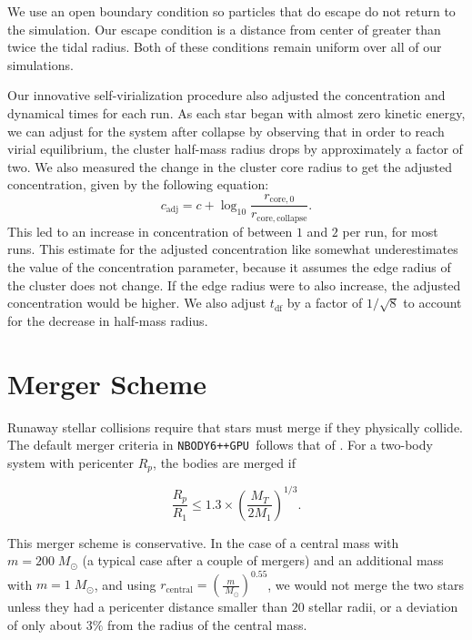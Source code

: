 \documentclass{princeton_astro_thesis}
\newcommand\Msun{\; M_\odot}
\newcommand\nbody{\texttt{NBODY6++GPU }}
\numberwithin{equation}{section}
\begin{document}
We use an open boundary condition so particles that do escape do not return to the simulation. Our escape condition is a distance from center of greater than twice the tidal radius. Both of these conditions remain uniform over all of our simulations. 

Our innovative self-virialization procedure also adjusted the concentration and dynamical times for each run.  As each star began with almost zero kinetic energy, we can adjust for the system after collapse by observing that in order to reach virial equilibrium, the cluster half-mass radius drops by approximately a factor of two. We also measured the change in the cluster core radius to get the adjusted concentration, given by the following equation:
\begin{equation}
c_{\mathrm{adj}} = c + \log_{10} \frac{r_{\mathrm{core},0}}{r_{\mathrm{core, collapse}}}.
\label{eqn:cadj}
\end{equation}
This led to an increase in concentration of between $1$ and $2$ per run, for most runs. This estimate for the adjusted concentration like somewhat underestimates the value of the concentration parameter, because it assumes the edge radius of the cluster does not change.  If the edge radius were to also increase, the adjusted concentration would be higher. We also adjust $t_{\mathrm{df}}$ by a factor of $1/\sqrt{8}$ to account for the decrease in half-mass radius. 


\section{Merger Scheme}

Runaway stellar collisions require that stars must merge if they physically collide. The default merger criteria in \nbody follows that of \citet{1992Kochanek}.  For a two-body system with pericenter $R_p$, the bodies are merged if

\begin{equation}
 \frac{R_{p}}{R_{1}} \leq 1.3 \times (\frac{M_T}{2M_1})^{1/3}.
 \label{eqn:kochanekcriteria}
\end{equation}

This merger scheme is conservative.  In the case of a central mass with $m = 200 \Msun$ (a typical case after a couple of mergers) and an additional mass with $m = 1 \Msun$, and using $r_{\mathrm{central}} = (\frac{m}{\Msun})^{0.55}$, we would not merge the two stars unless they had a pericenter distance smaller than $20$ stellar radii, or a deviation of only about $3\%$ from the radius of the central mass.
\end{document}
